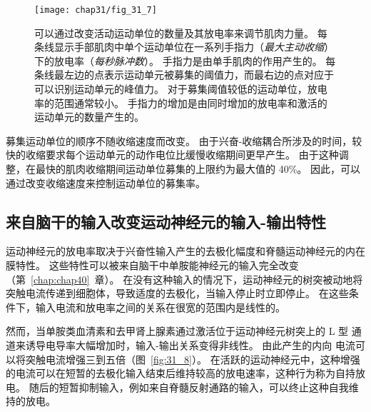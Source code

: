 \begin{figure}[htbp]
	\centering
	\texttt{[image: chap31/fig\_31\_7]}
	\caption{可以通过改变活动运动单位的数量及其放电率来调节肌肉力量。
	每条线显示手部肌肉中单个运动单位在一系列手指力（\textit{最大主动收缩}）下的放电率（\textit{每秒脉冲数}）。
	手指力是由单手肌肉的作用产生的。
	每条线最左边的点表示运动单元被募集的阈值力，而最右边的点对应于可以识别运动单元的峰值力。
	对于募集阈值较低的运动单位，放电率的范围通常较小。
	手指力的增加是由同时增加的放电率和激活的运动单元的数量产生的\cite{moritz2005discharge}。}
	\label{fig:31_7}
\end{figure}


募集运动单位的顺序不随收缩速度而改变。
由于兴奋-收缩耦合所涉及的时间，较快的收缩要求每个运动单元的动作电位比缓慢收缩期间更早产生。
由于这种调整，在最快的肌肉收缩期间运动单位募集的上限约为最大值的 40\%。
因此，可以通过改变收缩速度来控制运动单位的募集率。



\subsection{来自脑干的输入改变运动神经元的输入-输出特性}

运动神经元的放电率取决于兴奋性输入产生的去极化幅度和脊髓运动神经元的内在膜特性。
这些特性可以被来自脑干中单胺能神经元的输入完全改变（第~\ref{chap:chap40}~章）。
在没有这种输入的情况下，运动神经元的树突被动地将突触电流传递到细胞体，导致适度的去极化，当输入停止时立即停止。
在这些条件下，输入电流和放电率之间的关系在很宽的范围内是线性的。


然而，当单胺类血清素和去甲肾上腺素通过激活位于运动神经元树突上的 L 型  通道来诱导电导率大幅增加时，输入-输出关系变得非线性。
由此产生的内向  电流可以将突触电流增强三到五倍（图~\ref{fig:31_8}）。
在活跃的运动神经元中，这种增强的电流可以在短暂的去极化输入结束后维持较高的放电速率，这种行为称为自持放电。
随后的短暂抑制输入，例如来自脊髓反射通路的输入，可以终止这种自我维持的放电。


